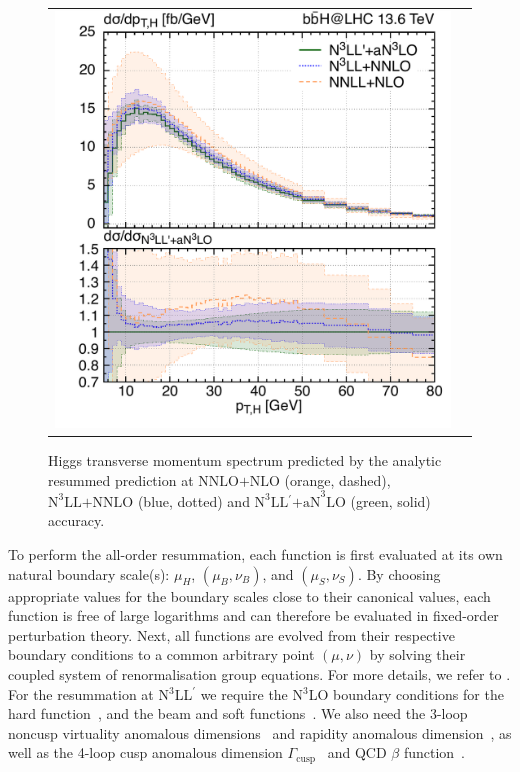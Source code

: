 \documentclass[11pt,a4paper]{article}
\begin{document}
\begin{figure}[t!]
	\begin{center}
		\begin{tabular}{cc}
			\includegraphics[width=.55\textwidth, page=1]{plots/5fs/resummation/ptzoom_Higgs__resum.pdf}
		\end{tabular}
		\vspace*{1ex}
		\caption{Higgs transverse momentum spectrum predicted by the analytic resummed prediction at $\text{NNLO+NLO}$ (orange, dashed), $\text{N}^3\text{LL+NNLO}$ (blue, dotted) and $\text{N}^3\text{LL$^{\prime}$+aN}^3\text{LO}$ (green, solid) accuracy.\label{fig:resumplot}}
	\end{center}
\end{figure}
To perform the all-order resummation, each function is first evaluated at its own
natural boundary scale(s): $\mu_H$, $(\mu_B, \nu_B)$, and $(\mu_S, \nu_S)$. By
choosing appropriate values for the boundary scales close to their canonical
values, each function is free of large logarithms and can
therefore be evaluated in fixed-order perturbation theory. Next, all functions are evolved from their respective boundary conditions to a common arbitrary point
$(\mu, \nu)$ by solving their coupled system of renormalisation group equations. For more details, we refer to .
For the resummation at N$^3$LL$^{\prime}$ we require the N$^3$LO
boundary conditions for the hard function~\cite{Gehrmann:2014vha,
	Ebert:2017uel}, and the beam and soft functions~\cite{Lubbert:2016rku,
	Li:2016ctv, Billis:2019vxg, Luo:2019szz, Ebert:2020yqt}. We also need the 3-loop
noncusp virtuality anomalous dimensions~\cite{Lubbert:2016rku, Moch:2005id, Stewart:2010qs,
	Bruser:2018rad, Billis:2019vxg} and rapidity anomalous
dimension~\cite{Lubbert:2016rku, Li:2016ctv, Vladimirov:2016dll}, as well as
the 4-loop cusp anomalous dimension
$\Gamma_\mathrm{cusp}$~\cite{Korchemsky:1987wg, moch:2004pa, Bruser:2019auj,
	Henn:2019swt, vonManteuffel:2020vjv} and QCD $\beta$
function~\cite{Tarasov:1980au, Larin:1993tp, vanRitbergen:1997va,
	Czakon:2004bu}.
\end{document}
